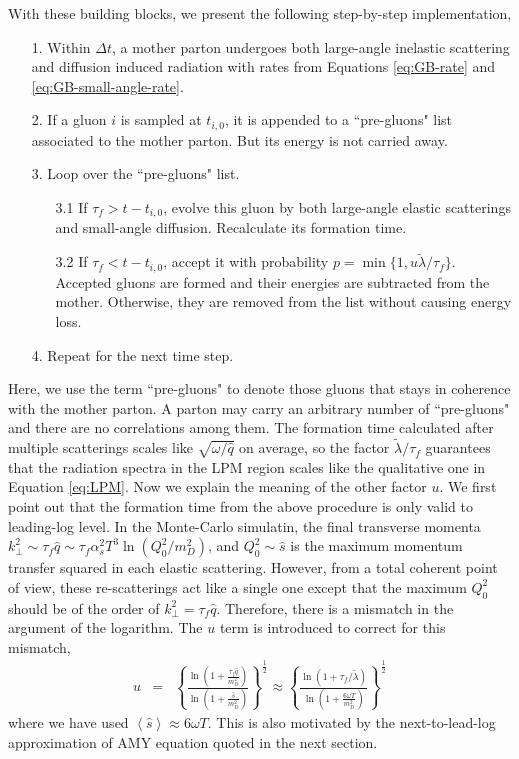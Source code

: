 \documentclass[aps, prc, reprint, amsmath, groupedaddress, nofootinbib]{revtex4-1}
\begin{document}
{With these building blocks, we present the following step-by-step implementation,
\begin{itemize}
\item[1.] Within $\Delta t$, a mother parton undergoes both large-angle inelastic scattering and diffusion induced radiation with rates from Equations \ref{eq:GB-rate} and \ref{eq:GB-small-angle-rate}.
\item[2.] If a gluon $i$ is sampled at $t_{i,0}$, it is appended to a ``pre-gluons" list associated to the mother parton. But its energy is not carried away.
\item[3.] Loop over the ``pre-gluons" list. 
\begin{itemize}
\item[3.1] If $\tau_f > t-t_{i,0}$, evolve this gluon by both large-angle elastic scatterings and small-angle diffusion. Recalculate its formation time.
\item[3.2] If $\tau_f < t-t_{i,0}$, accept it with probability $p = \min\{1, u\tilde{\lambda}/\tau_f\}$. Accepted gluons are formed and their energies are subtracted from the mother. Otherwise, they are removed from the list without causing energy loss.
\end{itemize} 
\item[4.] Repeat for the next time step.
\end{itemize}
Here, we use the term ``pre-gluons" to denote those gluons that stays in coherence with the mother parton.
A parton may carry an arbitrary number of ``pre-gluons" and there are no correlations among them.
The formation time calculated after multiple scatterings scales like $\sqrt{\omega/\hat{q}}$ on average, so the factor $\tilde{\lambda}/\tau_f$ guarantees that the radiation spectra in the LPM region scales like the qualitative one in Equation \ref{eq:LPM}.
Now we explain the meaning of the other factor $u$.
We first point out that the formation time from the above procedure is only valid to leading-log level.
In the Monte-Carlo simulatin, the final transverse momenta $k_\perp^2\sim \tau_f \hat{q} \sim \tau_f \alpha_s^2 T^3 \ln(Q_0^2/m_D^2)$, 
and $Q_0^2\sim \hat{s}$ is the maximum momentum transfer squared in each elastic scattering.
However, from a total coherent point of view, these re-scatterings act like a single one except that the maximum $Q_0^2$ should be of the order of $k_\perp^2 = \tau_f \hat{q}$.
Therefore, there is a mismatch in the argument of the logarithm.
The $u$ term is introduced to correct for this mismatch,
\begin{eqnarray}
u &=& \left\{\frac{\ln\left(1+\frac{\tau_f\hat{q}}{m_D^2}\right)}{\ln\left(1+\frac{\hat{s}}{m_D^2}\right)}\right\}^{\frac{1}{2}}
\approx \left\{\frac{\ln\left(1+\tau_f/\tilde{\lambda}\right)}{\ln\left(1+\frac{6\omega T}{m_D^2}\right)}\right\}^{\frac{1}{2}}
\end{eqnarray} 
where we have used $\left\langle\hat{s}\right\rangle \approx 6 \omega T$.
This is also motivated by the next-to-lead-log approximation of AMY equation quoted in the next section.

}
\end{document}
